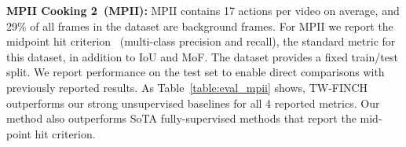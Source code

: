 \documentclass[10pt,twocolumn,letterpaper]{article}
\begin{document}
\noindent\textbf{MPII Cooking 2~(MPII):} MPII contains 17 actions per video on average, and 29\% of all frames in the dataset are background frames. For MPII we report the midpoint hit criterion~\cite{rohrbach2012database} (multi-class precision and recall), the standard metric for this dataset, in addition to IoU and MoF. The dataset provides a fixed train/test split. We report performance on the test set to enable direct comparisons with previously reported results.
As Table~\ref{table:eval_mpii} shows, TW-FINCH outperforms our strong unsupervised baselines for all 4 reported metrics. Our method also outperforms SoTA fully-supervised methods that report the mid-point hit criterion.






\begin{table}[t]
\centering
{}
\caption{Comparison on the Hollywood Extended dataset~\cite{he_paper}. \label{table:eval_he}}
\end{table}
\end{document}
